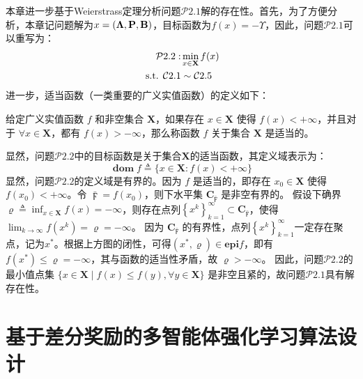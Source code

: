 本章进一步基于Weierstrass定理\cite{liu2020zui}分析问题$\mathcal{P}2.1$解的存在性。首先，为了方便分析，本章记问题解为$x = (\bf\Lambda, \mathbf{P}, \mathbf{B} )$，目标函数为$f(x) = -\Upsilon$，因此，问题$\mathcal{P}2.1$可以重写为：
\begin{align}
	\mathcal{P}2.2: &\min_{x \in \mathbf{X}} f(x) \notag \\
	\text { s.t. }
    \mathcal{C}2.1 &\sim \mathcal{C}2.5
\end{align}
\noindent 进一步，适当函数（一类重要的广义实值函数）的定义如下：
\begin{definition}
	给定广义实值函数 $f$ 和非空集合 $\mathbf{X}$，如果存在 $x \in \mathbf{X}$ 使得 $f(x) < +\infty$，并且对于 $\forall x \in \mathbf{X} $，都有 $f(x) > -\infty$，那么称函数 $f$ 关于集合 $\mathbf{X}$ 是适当的。
\end{definition}
\noindent 显然，问题$\mathcal{P}2.2$中的目标函数是关于集合$\mathbf{X}$的适当函数，其定义域表示为：
\begin{equation}
\operatorname{\mathbf{dom}} f \triangleq \{x \in \mathbf{X}: f(x)<+\infty\}
\end{equation}
显然，问题$\mathcal{P}2.2$的定义域是有界的。因为 $f$ 是适当的，即存在 $x_0 \in \mathbf{X}$ 使得 $f(x_0) < +\infty$。令 $\bar{\digamma}=f\left(x_0\right)$，则下水平集 $\mathbf{C}_{\bar{\digamma}}$ 是非空有界的。
假设下确界$\varrho \triangleq \inf_{x \in \mathbf{X}} f(x)=-\infty$，则存在点列$\left\{x^k\right\}_{k=1}^{\infty} \subset \mathbf{C}_{\bar{\digamma}}$，使得$\lim _{k \rightarrow \infty} f\left(x^k\right)=\varrho=-\infty$。
因为 $\mathbf{C}_{\bar{\digamma}}$ 的有界性，点列$\left\{x^k\right\}_{k=1}^{\infty}$一定存在聚点，记为$x^*$。根据上方图的闭性，可得$\left(x^*, \varrho\right) \in \mathbf{e p i} f $，即有$f(x^*) \leq \varrho = -\infty$，其与函数的适当性矛盾，故 $\varrho > -\infty$。
因此，问题$\mathcal{P}2.2$的最小值点集 $\{x \in \mathbf{X} \mid f(x) \leqslant f(y), \forall y \in \mathbf{X}\}$ 是非空且紧的，故问题$\mathcal{P}2.1$具有解存在性。


\section[\hspace{-2pt}基于差分奖励的多智能体强化学习算法设计]{{ \hspace{-8pt}基于差分奖励的多智能体强化学习算法设计}}\label{section 2-5}

